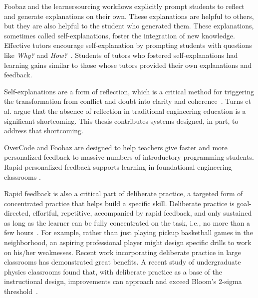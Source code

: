 
Foobaz and the learnersourcing workflows explicitly prompt students to reflect and generate explanations on their own. These explanations are helpful to others, but they are also helpful to the student who generated them. These explanations, sometimes called self-explanations, foster the integration of new knowledge. Effective tutors encourage self-explanation by prompting students with questions like {\it Why?} and {\it How?}~\cite{selfexplanation}. Students of tutors who fostered self-explanations had learning gains similar to those whose tutors provided their own explanations and feedback\cite{chi2001learning}. 

Self-explanations are a form of reflection, which is a critical method for triggering the transformation from conflict and doubt into clarity and coherence~\cite{dewey1933}. Turns et al. \cite{asee} argue that the absence of reflection in traditional engineering education is a significant shortcoming. This thesis contributes systems designed, in part, to address that shortcoming.




OverCode and Foobaz are designed to help teachers give faster and more personalized feedback to massive numbers of introductory programming students. Rapid personalized feedback supports learning in foundational engineering classrooms \cite{ieeeRapidFeedback}. 

Rapid feedback is also a critical part of deliberate practice, a targeted form of concentrated practice that helps build a specific skill. Deliberate practice is goal-directed, effortful, repetitive, accompanied by rapid feedback, and only sustained as long as the learner can be fully concentrated on the task, i.e., no more than a few hours~\cite{Gobet2012}. For example, rather than just playing pickup basketball games in the neighborhood, an aspiring professional player might design specific drills to work on his/her weaknesses. Recent work incorporating deliberate practice in large classrooms has demonstrated great benefits. A recent study of undergraduate physics classrooms found that, with deliberate practice as a base of the instructional design, improvements can approach and exceed Bloom's 2-sigma threshold~\cite{Deslauriers862}.

